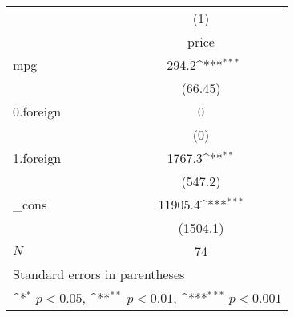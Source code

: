 {
\def\sym#1{\ifmmode^{#1}\else\(^{#1}\)\fi}
\begin{tabular}{l*{1}{c}}
\hline\hline
            &\multicolumn{1}{c}{(1)}\\
            &\multicolumn{1}{c}{price}\\
\hline
mpg         &      -294.2\sym{***}\\
            &     (66.45)         \\
[1em]
0.foreign   &           0         \\
            &         (0)         \\
[1em]
1.foreign   &      1767.3\sym{**} \\
            &     (547.2)         \\
[1em]
\_cons      &     11905.4\sym{***}\\
            &    (1504.1)         \\
\hline
\(N\)       &          74         \\
\hline\hline
\multicolumn{2}{l}{\footnotesize Standard errors in parentheses}\\
\multicolumn{2}{l}{\footnotesize \sym{*} \(p<0.05\), \sym{**} \(p<0.01\), \sym{***} \(p<0.001\)}\\
\end{tabular}
}
